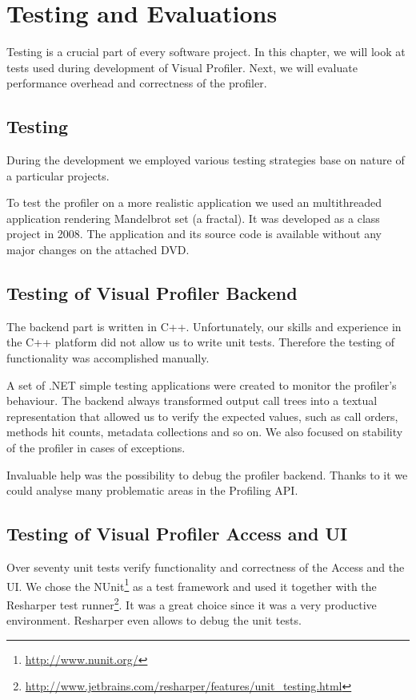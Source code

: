 \chapter{Testing and Evaluations}
\label{chap:07TestingEval}
Testing is a crucial part of every software project. In this chapter, we will look at tests used during development of Visual Profiler. Next, we will evaluate performance overhead and correctness of the profiler.

\section{Testing}
During the development we employed various testing strategies base on nature of a particular projects. 

To test the profiler on a more realistic application we used an multithreaded application rendering Mandelbrot set (a fractal). It was developed as a class project in 2008. The application and its source code is available without any major changes on the attached DVD. 

\section{Testing of Visual Profiler Backend}
The backend part is written in C++. Unfortunately, our skills and experience in the C++ platform did not allow us to write unit tests. Therefore the testing of functionality was accomplished manually. 

A set of .NET simple testing applications were created to monitor  the profiler's behaviour. The backend always transformed output call trees into a textual representation that allowed us to verify the expected values, such as call orders, methods hit counts, metadata collections and so on. We also focused on stability of the profiler in cases of exceptions.

Invaluable help was the possibility to debug the profiler backend. Thanks to it we could analyse many problematic areas in the Profiling API.

\section{Testing of Visual Profiler Access and UI}
Over seventy unit tests verify functionality and correctness of the Access and the UI. We chose the NUnit\footnote{\href{http://www.nunit.org/}{http://www.nunit.org/}} as a test framework and used it together with the Resharper test runner\footnote{\href{http://www.jetbrains.com/resharper/features/unit_testing.html}{http://www.jetbrains.com/resharper/features/unit\_testing.html}}. It was a great choice since it was a very productive environment. Resharper even allows to debug the unit tests.

